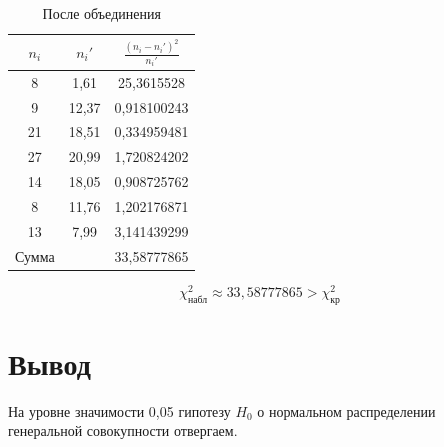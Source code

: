 \documentclass{article}
\begin{document}
\begin{center}
    \begin{table}[H]
        \centering
        \begin{tabular}{|*{3}{c|}}
            \hline
            $n_i$ &$n_i'$& $\frac{(n_i-n_i')^2}{n_i'}$\\
            \hline
            8 & 1,61 & 25,3615528 \\
            \hline
            9 & 12,37 & 0,918100243 \\
            \hline
            21 & 18,51 & 0,334959481 \\
            \hline
            27 & 20,99 & 1,720824202 \\
            \hline
            14 & 18,05 & 0,908725762 \\
            \hline
            8 & 11,76 & 1,202176871 \\
            \hline
            13 & 7,99 & 3,141439299\\
            \hline
             Сумма& &33,58777865\\
             \hline
        \end{tabular}
        \caption{После объединения}
    \end{table}
\end{center}
\[\chi^2_{\text{набл}} \approx 33,58777865 > \chi^2_{\text{кр}}\]
\section*{Вывод}
На уровне значимости 0,05 гипотезу $H_0$ о нормальном распределении генеральной совокупности отвергаем.
\end{document}
